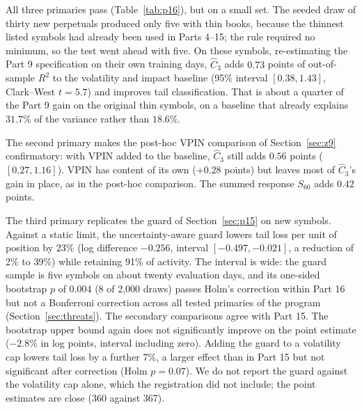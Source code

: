 \documentclass[12pt]{article}
\theoremstyle{definition}
\theoremstyle{remark}
\begin{document}
All three primaries pass (Table~\ref{tab:p16}), but on a small set. The seeded draw of thirty new perpetuals produced only five with thin books, because the thinnest listed symbols had already been used in Parts 4--15; the rule required no minimum, so the test went ahead with five. On these symbols, re-estimating the Part 9 specification on their own training days, $\hat C_3$ adds $0.73$ points of out-of-sample $R^2$ to the volatility and impact baseline (95\% interval $[0.38,1.43]$, Clark--West $t=5.7$) and improves tail classification. That is about a quarter of the Part 9 gain on the original thin symbols, on a baseline that already explains $31.7\%$ of the variance rather than $18.6\%$.

The second primary makes the post-hoc VPIN comparison of Section~\ref{sec:z9} confirmatory: with VPIN added to the baseline, $\hat C_3$ still adds $0.56$ points ($[0.27,1.16]$). VPIN has content of its own ($+0.28$ points) but leaves most of $\hat C_3$'s gain in place, as in the post-hoc comparison. The summed response $S_{60}$ adds $0.42$ points.

The third primary replicates the guard of Section~\ref{sec:p15} on new symbols. Against a static limit, the uncertainty-aware guard lowers tail loss per unit of position by 23\% (log difference $-0.256$, interval $[-0.497,-0.021]$, a reduction of 2\% to 39\%) while retaining 91\% of activity. The interval is wide: the guard sample is five symbols on about twenty evaluation days, and its one-sided bootstrap $p$ of $0.004$ (8 of 2{,}000 draws) passes Holm's correction within Part 16 but not a Bonferroni correction across all tested primaries of the program (Section~\ref{sec:threats}). The secondary comparisons agree with Part 15. The bootstrap upper bound again does not significantly improve on the point estimate ($-2.8\%$ in log points, interval including zero). Adding the guard to a volatility cap lowers tail loss by a further 7\%, a larger effect than in Part 15 but not significant after correction (Holm $p=0.07$). We do not report the guard against the volatility cap alone, which the registration did not include; the point estimates are close (360 against 367).
\end{document}
